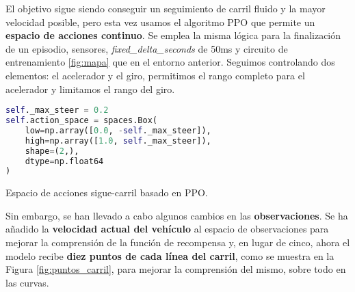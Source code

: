 El objetivo sigue siendo conseguir un seguimiento de carril fluido y la mayor velocidad posible, pero esta vez usamos el algoritmo \ac{PPO} que permite un \textbf{espacio de acciones continuo}. Se emplea la misma lógica para la finalización de un episodio, sensores, \textit{fixed\_delta\_seconds} de 50ms y circuito de entrenamiento \ref{fig:mapa} que en el entorno anterior. Seguimos controlando dos elementos: el acelerador y el giro, permitimos el rango completo para el acelerador y limitamos el rango del giro.

\begin{code}[h]
\begin{lstlisting}[language=Python]
self._max_steer = 0.2
self.action_space = spaces.Box(
    low=np.array([0.0, -self._max_steer]),
    high=np.array([1.0, self._max_steer]),
    shape=(2,),
    dtype=np.float64
)
\end{lstlisting}
\caption[Espacio de acciones sigue-carril basado en \ac{PPO}]{Espacio de acciones sigue-carril basado en \ac{PPO}.}
\label{cod:acc_ppo}
\end{code}

Sin embargo, se han llevado a cabo algunos cambios en las \textbf{observaciones}. Se ha añadido la \textbf{velocidad actual del vehículo} al espacio de observaciones para mejorar la comprensión de la función de recompensa y, en lugar de cinco, ahora el modelo recibe \textbf{diez puntos de cada línea del carril}, como se muestra en la Figura \ref{fig:puntos_carril}, para mejorar la comprensión del mismo, sobre todo en las curvas.

